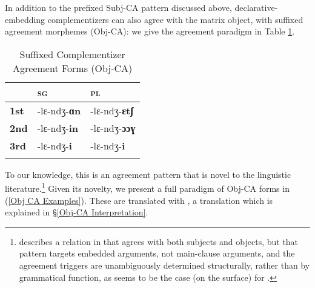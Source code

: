 \documentclass[output=paper
,newtxmath
,modfonts
,nonflat]{langsci/langscibook}
\begin{document}
In addition to the prefixed Subj-CA pattern discussed above,  declarative-embedding complementizers can also agree with the matrix object, with suffixed agreement morphemes (Obj-CA): we give the agreement paradigm in Table \ref{Obj CA Forms Table}. 


\begin{table}[H]
\caption{Suffixed Complementizer Agreement Forms (Obj-CA)}
\label{Obj CA Forms Table}
 \begin{tabular}{lll} 
  \lsptoprule
   {} & \textsc{\textsc{sg}} & \textsc{pl} \\ 
  \midrule
   \textbf{1st} & -lɛ-ndʒ-\textbf{ɑn} & -lɛ-ndʒ-\textbf{ɛtʃ} \\
   \textbf{2nd} & -lɛ-ndʒ-\textbf{in} & -lɛ-ndʒ-\textbf{ɔɔɣ} \\
   \textbf{3rd} & -lɛ-ndʒ-\textbf{i} & -lɛ-ndʒ-\textbf{i} \\
  \lspbottomrule
 \end{tabular}
\end{table}

\noindent To our knowledge, this is an agreement pattern that is novel to the linguistic literature.\footnote{\citet{Deal:2015} describes a  relation in  that agrees with both subjects and objects, but that pattern targets embedded arguments, not main-clause arguments, and the agreement triggers are unambiguously determined structurally, rather than by grammatical function, as seems to be the case (on the surface) for .}  Given its novelty, we present a full paradigm of Obj-CA forms in (\ref{Obj CA Examples}). These are translated with , a translation which is explained in \S \ref{Obj-CA Interpretation}. 
\end{document}
